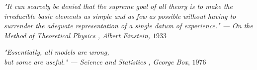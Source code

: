 \thispagestyle{empty}
\begin{flushright}
\null{}
\emph{"It can scarcely be denied that the supreme goal of all theory is to make the irreducible basic elements as simple and as few as possible without having to surrender the adequate representation of a single datum of experience." \break --- On the Method of Theoretical Physics \cite{Einstein}, Albert Einstein, $ 1933 $}

\bigskip

\null\vspace{5mm}
\emph{"Essentially, all models are wrong, \\but some are useful." \break --- Science and Statistics \cite{Box}, George Box}, $ 1976 $ \null
\end{flushright}
